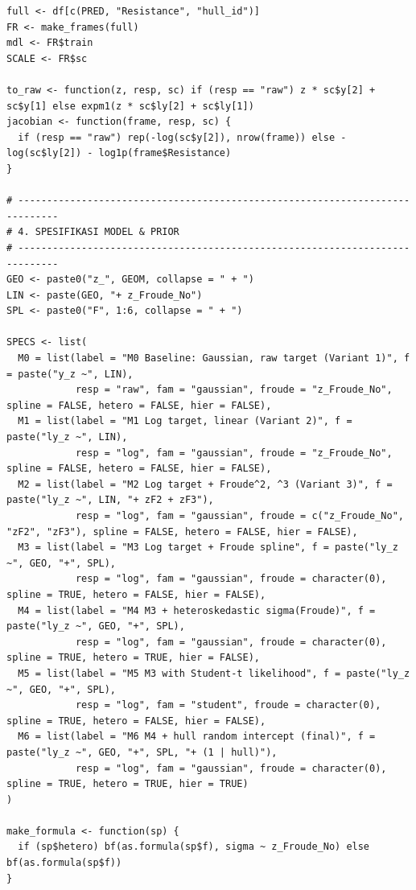 \documentclass[
]{article}
\begin{document}
\begin{verbatim}
full <- df[c(PRED, "Resistance", "hull_id")]
FR <- make_frames(full)
mdl <- FR$train
SCALE <- FR$sc

to_raw <- function(z, resp, sc) if (resp == "raw") z * sc$y[2] + sc$y[1] else expm1(z * sc$ly[2] + sc$ly[1])
jacobian <- function(frame, resp, sc) {
  if (resp == "raw") rep(-log(sc$y[2]), nrow(frame)) else -log(sc$ly[2]) - log1p(frame$Resistance)
}

# -----------------------------------------------------------------------------
# 4. SPESIFIKASI MODEL & PRIOR
# -----------------------------------------------------------------------------
GEO <- paste0("z_", GEOM, collapse = " + ")
LIN <- paste(GEO, "+ z_Froude_No")
SPL <- paste0("F", 1:6, collapse = " + ")

SPECS <- list(
  M0 = list(label = "M0 Baseline: Gaussian, raw target (Variant 1)", f = paste("y_z ~", LIN),
            resp = "raw", fam = "gaussian", froude = "z_Froude_No", spline = FALSE, hetero = FALSE, hier = FALSE),
  M1 = list(label = "M1 Log target, linear (Variant 2)", f = paste("ly_z ~", LIN),
            resp = "log", fam = "gaussian", froude = "z_Froude_No", spline = FALSE, hetero = FALSE, hier = FALSE),
  M2 = list(label = "M2 Log target + Froude^2, ^3 (Variant 3)", f = paste("ly_z ~", LIN, "+ zF2 + zF3"),
            resp = "log", fam = "gaussian", froude = c("z_Froude_No", "zF2", "zF3"), spline = FALSE, hetero = FALSE, hier = FALSE),
  M3 = list(label = "M3 Log target + Froude spline", f = paste("ly_z ~", GEO, "+", SPL),
            resp = "log", fam = "gaussian", froude = character(0), spline = TRUE, hetero = FALSE, hier = FALSE),
  M4 = list(label = "M4 M3 + heteroskedastic sigma(Froude)", f = paste("ly_z ~", GEO, "+", SPL),
            resp = "log", fam = "gaussian", froude = character(0), spline = TRUE, hetero = TRUE, hier = FALSE),
  M5 = list(label = "M5 M3 with Student-t likelihood", f = paste("ly_z ~", GEO, "+", SPL),
            resp = "log", fam = "student", froude = character(0), spline = TRUE, hetero = FALSE, hier = FALSE),
  M6 = list(label = "M6 M4 + hull random intercept (final)", f = paste("ly_z ~", GEO, "+", SPL, "+ (1 | hull)"),
            resp = "log", fam = "gaussian", froude = character(0), spline = TRUE, hetero = TRUE, hier = TRUE)
)

make_formula <- function(sp) {
  if (sp$hetero) bf(as.formula(sp$f), sigma ~ z_Froude_No) else bf(as.formula(sp$f))
}


\end{verbatim}
\end{document}
